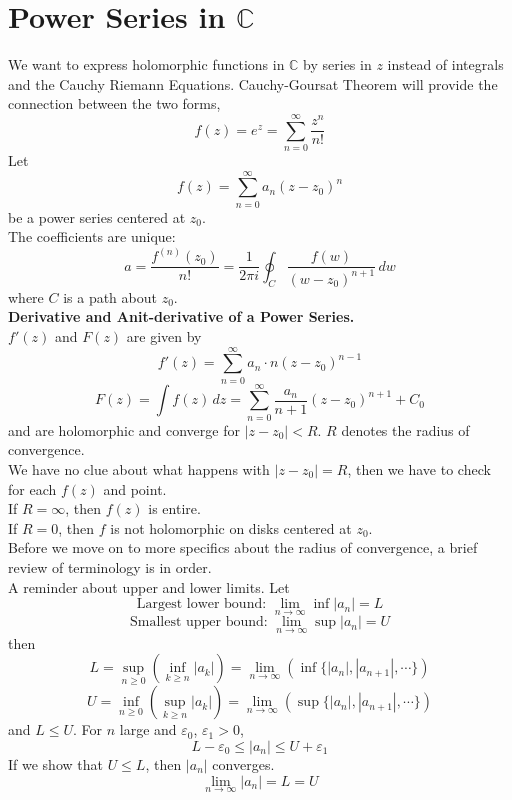 \documentclass[11pt]{article}
\begin{document}
\newpage
\section{Power Series in $\mathbb{C}$}
We want to express holomorphic functions in $\mathbb{C}$ by series in $z$ instead of integrals and the Cauchy Riemann Equations. Cauchy-Goursat Theorem will provide the connection between the two forms, 
$$ f(z) = e^z = \sum_{n = 0}^{\infty} \frac{z^n}{n!} $$
Let 
$$ f(z) = \sum_{n = 0}^{\infty} a_n(z - z_0)^n $$
be a power series centered at $z_0$. \\
The coefficients are unique: 
$$ a = \frac{f^{(n)} (z_0)}{n!} = \frac{1}{2\pi i} \oint_C \frac{f(w)}{(w - z_0)^{n + 1}} \, dw$$
where $C$ is a path about $z_0$. \\
\newline
\textbf{Derivative and Anit-derivative of a Power Series.} \\
$f'(z)$ and $F(z)$ are given by 
$$f'(z) = \sum_{n = 0}^{\infty} a_n \cdot n(z-z_0)^{n -1}$$
$$F(z) = \int f(z) \, dz = \sum_{n = 0}^{\infty} \frac{a_n}{n + 1}(z - z_0)^{n + 1} + C_0$$
and are holomorphic and converge for $|z -z _0| < R$. $R$ denotes the radius of convergence. \\
We have no clue about what happens with $|z - z_0| = R$, then we have to check for each $f(z)$ and point. \\
If $R = \infty$, then $f(z)$ is entire. \\
If $R = 0$, then $f$ is not holomorphic on disks centered at $z_0$. \\
\newline
Before we move on to more specifics about the radius of convergence, a brief review of terminology is in order. \\ 
A reminder about upper and lower limits. Let 
\begin{equation*}
\mbox{Largest lower bound: } \lim_{n \to \infty} \inf|a_n| = L
\end{equation*}
\begin{equation*}
\mbox{Smallest upper bound: }\lim_{n \to \infty} \sup|a_n| = U
\end{equation*}
then 
$$ L = \sup_{n \geqslant 0}(\inf_{k \geqslant n}|a_k|) = \lim_{n \to \infty} (\inf \{ |a_n|, |a_{n + 1}|, \cdots \})$$
$$ U = \inf_{n \geqslant 0}(\sup_{k \geqslant n}|a_k|) = \lim_{n \to \infty} (\sup \{ |a_n|, |a_{n + 1}|, \cdots \}) $$
and $L \leqslant U$. For $n$ large and $\varepsilon_0$, $\varepsilon_1 > 0$, 
$$L - \varepsilon_0 \leqslant |a_n| \leqslant U + \varepsilon_1$$
If we show that $U \leqslant L$, then $|a_n|$ converges.
$$\lim_{n \to \infty}|a_n| = L = U$$ 
\newline
\end{document}
